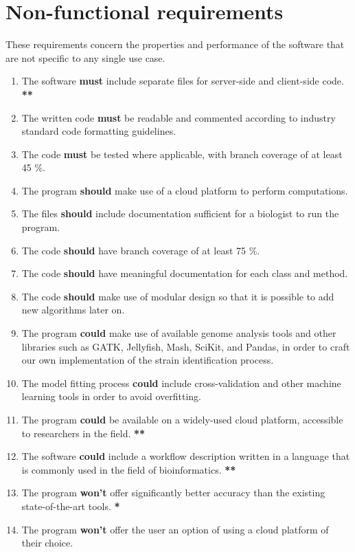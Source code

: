 \documentclass{report}
\begin{document}
\section{Non-functional requirements}
These requirements concern the properties and performance of the software that are not specific to any single use case.
\begin{enumerate}
    \item The software \textbf{must} include separate files for server-side and client-side code. \textbf{**}
    \item The written code \textbf{must} be readable and commented according to industry standard code formatting guidelines.
    \item The code \textbf{must} be tested where applicable, with branch coverage of at least 45 \%.
    
    \item The program \textbf{should} make use of a cloud platform to perform computations.
    \item The files \textbf{should} include documentation sufficient for a biologist to run the program.
    \item The code \textbf{should} have branch coverage of at least 75 \%.
    \item The code \textbf{should} have meaningful documentation for each class and method.
    \item The code \textbf{should} make use of modular design so that it is possible to add new algorithms later on.
    
    \item The program \textbf{could} make use of available genome analysis tools and other libraries such as GATK, Jellyfish, Mash, SciKit, and Pandas, in order to craft our own implementation of the strain identification process.
    \item The model fitting process \textbf{could} include cross-validation and other machine learning tools in order to avoid overfitting.
    \item The program \textbf{could} be available on a widely-used cloud platform, accessible to researchers in the field. \textbf{**}
    \item The software \textbf{could} include a workflow description written in a language that is commonly used in the field of bioinformatics. \textbf{**}
    
    \item The program \textbf{won't} offer significantly better accuracy than the existing state-of-the-art tools. \textbf{*}
    \item The program \textbf{won't} offer the user an option of using a cloud platform of their choice.
\end{enumerate}
\end{document}
